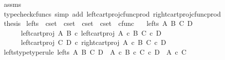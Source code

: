 \begin{isabellebody}
\ assms\ \isamarkupfalse%
\ {\isacharparenleft}{\kern0pt}typecheck{\isacharunderscore}{\kern0pt}cfuncs{\isacharcomma}{\kern0pt}\ simp\ add{\isacharcolon}{\kern0pt}\ left{\isacharunderscore}{\kern0pt}cart{\isacharunderscore}{\kern0pt}proj{\isacharunderscore}{\kern0pt}cfunc{\isacharunderscore}{\kern0pt}prod\ right{\isacharunderscore}{\kern0pt}cart{\isacharunderscore}{\kern0pt}proj{\isacharunderscore}{\kern0pt}cfunc{\isacharunderscore}{\kern0pt}prod{\isacharparenright}{\kern0pt}\isanewline
\ \ \isamarkupfalse%
\ \isamarkupfalse%
\ {\isacharquery}{\kern0pt}thesis\isacommand{{\isachardot}{\kern0pt}}\isamarkupfalse%
\isanewline
{}\isamarkupfalse%
%
\endisatagproof
{\isafoldproof}%
%
\isadelimproof
\isanewline
%
\endisadelimproof
\isanewline
{}\isamarkupfalse%
\ lefts\ {\isacharcolon}{\kern0pt}{\isacharcolon}{\kern0pt}\ {\isachardoublequoteopen}cset\ {\isasymRightarrow}\ cset\ {\isasymRightarrow}\ cset\ {\isasymRightarrow}\ cset\ {\isasymRightarrow}\ cfunc{\isachardoublequoteclose}\ \isanewline
\ \ {\isachardoublequoteopen}lefts\ A\ B\ C\ D\ {\isacharequal}{\kern0pt}\ {\isasymlangle}\isanewline
\ \ \ \ \ \ left{\isacharunderscore}{\kern0pt}cart{\isacharunderscore}{\kern0pt}proj\ A\ B\ {\isasymcirc}\isactrlsub c\ left{\isacharunderscore}{\kern0pt}cart{\isacharunderscore}{\kern0pt}proj\ {\isacharparenleft}{\kern0pt}A\ {\isasymtimes}\isactrlsub c\ B{\isacharparenright}{\kern0pt}\ {\isacharparenleft}{\kern0pt}C\ {\isasymtimes}\isactrlsub c\ D{\isacharparenright}{\kern0pt}{\isacharcomma}{\kern0pt}\isanewline
\ \ \ \ \ \ left{\isacharunderscore}{\kern0pt}cart{\isacharunderscore}{\kern0pt}proj\ C\ D\ {\isasymcirc}\isactrlsub c\ right{\isacharunderscore}{\kern0pt}cart{\isacharunderscore}{\kern0pt}proj\ {\isacharparenleft}{\kern0pt}A\ {\isasymtimes}\isactrlsub c\ B{\isacharparenright}{\kern0pt}\ {\isacharparenleft}{\kern0pt}C\ {\isasymtimes}\isactrlsub c\ D{\isacharparenright}{\kern0pt}\isanewline
\ \ \ \ {\isasymrangle}{\isachardoublequoteclose}\isanewline
\isanewline
{}\isamarkupfalse%
\ lefts{\isacharunderscore}{\kern0pt}type{\isacharbrackleft}{\kern0pt}type{\isacharunderscore}{\kern0pt}rule{\isacharbrackright}{\kern0pt}{\isacharcolon}{\kern0pt}\ {\isachardoublequoteopen}lefts\ A\ B\ C\ D\ {\isacharcolon}{\kern0pt}\ {\isacharparenleft}{\kern0pt}A\ {\isasymtimes}\isactrlsub c\ B{\isacharparenright}{\kern0pt}\ {\isasymtimes}\isactrlsub c\ {\isacharparenleft}{\kern0pt}C\ {\isasymtimes}\isactrlsub c\ D{\isacharparenright}{\kern0pt}\ {\isasymrightarrow}\ {\isacharparenleft}{\kern0pt}A\ {\isasymtimes}\isactrlsub c\ C{\isacharparenright}{\kern0pt}{\isachardoublequoteclose}\isanewline

\end{isabellebody}
